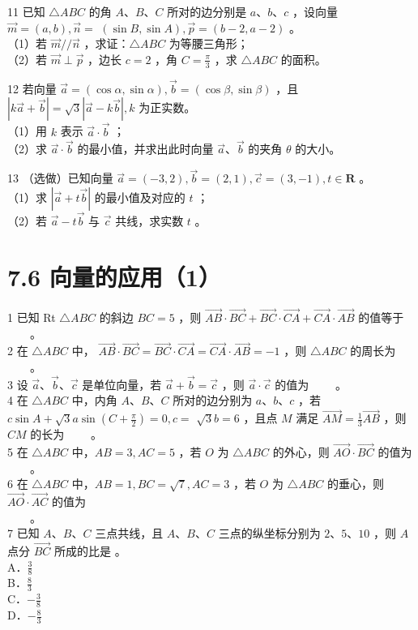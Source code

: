 \documentclass[10pt]{article}
\begin{document}
11 已知 \(\triangle A B C\) 的角 \(A 、 B 、 C\) 所对的边分别是 \(a 、 b 、 c\) ，设向量 \(\vec{m}=(a, b), \vec{n}=\) \((\sin B, \sin A), \vec{p}=(b-2, a-2)\) 。\\
（1）若 \(\vec{m} / / \vec{n}\) ，求证：\(\triangle A B C\) 为等腰三角形；\\
（2）若 \(\vec{m} \perp \vec{p}\) ，边长 \(c=2\) ，角 \(C=\frac{\pi}{3}\) ，求 \(\triangle A B C\) 的面积。

12 若向量 \(\vec{a}=(\cos \alpha, \sin \alpha), \vec{b}=(\cos \beta, \sin \beta)\) ，且 \(|k \vec{a}+\vec{b}|=\sqrt{3}|\vec{a}-k \vec{b}|, k\) 为正实数。\\
（1）用 \(k\) 表示 \(\vec{a} \cdot \vec{b}\) ；\\
（2）求 \(\vec{a} \cdot \vec{b}\) 的最小值，并求出此时向量 \(\vec{a} 、 \vec{b}\) 的夹角 \(\theta\) 的大小。

13 （选做）已知向量 \(\vec{a}=(-3,2), \vec{b}=(2,1), \vec{c}=(3,-1), t \in \mathbf{R}\) 。\\
（1）求 \(|\vec{a}+t \vec{b}|\) 的最小值及对应的 \(t\) ；\\
（2）若 \(\vec{a}-t \vec{b}\) 与 \(\vec{c}\) 共线，求实数 \(t\) 。

\section*{7.6 向量的应用（1）}
1 已知 Rt \(\triangle A B C\) 的斜边 \(B C=5\) ，则 \(\overrightarrow{A B} \cdot \overrightarrow{B C}+\overrightarrow{B C} \cdot \overrightarrow{C A}+\overrightarrow{C A} \cdot \overrightarrow{A B}\) 的值等于 \(\qquad\)。\\
2 在 \(\triangle A B C\) 中， \(\overrightarrow{A B} \cdot \overrightarrow{B C}=\overrightarrow{B C} \cdot \overrightarrow{C A}=\overrightarrow{C A} \cdot \overrightarrow{A B}=-1\) ，则 \(\triangle A B C\) 的周长为 \(\qquad\)。\\
3 设 \(\vec{a} 、 \vec{b} 、 \vec{c}\) 是单位向量，若 \(\vec{a}+\vec{b}=\vec{c}\) ，则 \(\vec{a} \cdot \vec{c}\) 的值为 \(\qquad\)。\\
4 在 \(\triangle A B C\) 中，内角 \(A 、 B 、 C\) 所对的边分别为 \(a 、 b 、 c\) ，若 \(c \sin A+\sqrt{3} a \sin \left(C+\frac{\pi}{2}\right)=0, c=\) \(\sqrt{3} b=6\) ，且点 \(M\) 满足 \(\overrightarrow{A M}=\frac{1}{3} \overrightarrow{A B}\) ，则 \(C M\) 的长为 \(\qquad\)。\\
5 在 \(\triangle A B C\) 中，\(A B=3, A C=5\) ，若 \(O\) 为 \(\triangle A B C\) 的外心，则 \(\overrightarrow{A O} \cdot \overrightarrow{B C}\) 的值为 \(\qquad\)。\\
6 在 \(\triangle A B C\) 中，\(A B=1, B C=\sqrt{7}, A C=3\) ，若 \(O\) 为 \(\triangle A B C\) 的垂心，则 \(\overrightarrow{A O} \cdot \overrightarrow{A C}\) 的值为\\
\(\qquad\)。\\
7 已知 \(A 、 B 、 C\) 三点共线，且 \(A 、 B 、 C\) 三点的纵坐标分别为 \(2 、 5 、 10\) ，则 \(A\) 点分 \(\overrightarrow{B C}\) 所成的比是 。\\
A．\(\frac{3}{8}\)\\
B．\(\frac{8}{3}\)\\
C．\(-\frac{3}{8}\)\\
D．\(-\frac{8}{3}\)
\end{document}
